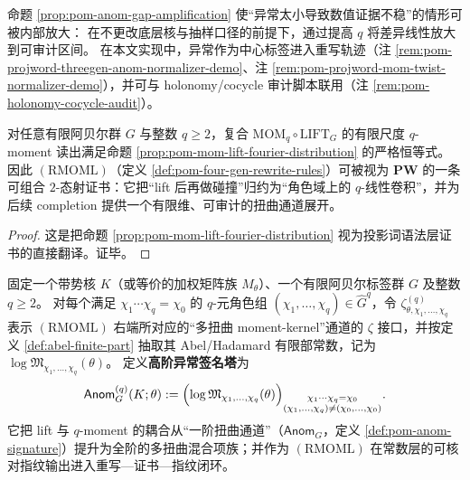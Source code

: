 \begin{remark}\label{rem:pom-anom-gap-amplification-meaning}
命题 \ref{prop:pom-anom-gap-amplification} 使“异常太小导致数值证据不稳”的情形可被内部放大：
在不更改底层核与抽样口径的前提下，通过提高 \(q\) 将差异线性放大到可审计区间。
在本文实现中，异常作为中心标签进入重写轨迹（注 \ref{rem:pom-projword-threegen-anom-normalizer-demo}、注 \ref{rem:pom-projword-mom-twist-normalizer-demo}），并可与 holonomy/cocycle 审计脚本联用（注 \ref{rem:pom-holonomy-cocycle-audit}）。
\end{remark}

\begin{proposition}\label{prop:pom-rmoml-sound}
对任意有限阿贝尔群 \(G\) 与整数 \(q\ge 2\)，复合 \(\mathrm{MOM}_q\circ \mathrm{LIFT}_G\) 的有限尺度 \(q\)-moment 读出满足命题 \ref{prop:pom-mom-lift-fourier-distribution} 的严格恒等式。
因此 \((\mathrm{RMOML})\)（定义 \ref{def:pom-four-gen-rewrite-rules}）可被视为 \(\mathbf{PW}\) 的一条可组合 \(2\)-态射证书：它把“lift 后再做碰撞”归约为“角色域上的 \(q\)-线性卷积”，并为后续 completion 提供一个有限维、可审计的扭曲通道展开。
\end{proposition}
\begin{proof}
这是把命题 \ref{prop:pom-mom-lift-fourier-distribution} 视为投影词语法层证书的直接翻译。证毕。
\end{proof}

\begin{definition}\label{def:pom-anom-signature-tower}
固定一个带势核 \(K\)（或等价的加权矩阵族 \(M_\theta\)）、一个有限阿贝尔标签群 \(G\) 及整数 \(q\ge 2\)。
对每个满足 \(\chi_1\cdots\chi_q=\chi_0\) 的 \(q\)-元角色组 \((\chi_1,\dots,\chi_q)\in\widehat G^q\)，令
\(\zeta^{(q)}_{\theta,\chi_1,\dots,\chi_q}\)
表示 \((\mathrm{RMOML})\) 右端所对应的“多扭曲 moment-kernel”通道的 \(\zeta\) 接口，并按定义 \ref{def:abel-finite-part} 抽取其 Abel/Hadamard 有限部常数，记为 \(\log\mathfrak{M}_{\chi_1,\dots,\chi_q}(\theta)\)。
定义\textbf{高阶异常签名塔}为
\[
\mathsf{Anom}^{(q)}_{G}(K;\theta)
:=\Bigl(\log\mathfrak{M}_{\chi_1,\dots,\chi_q}(\theta)\Bigr)_{\substack{\chi_1\cdots\chi_q=\chi_0\\ (\chi_1,\dots,\chi_q)\neq(\chi_0,\dots,\chi_0)}}.
\]
它把 lift 与 \(q\)-moment 的耦合从“一阶扭曲通道”（\(\mathsf{Anom}_G\)，定义 \ref{def:pom-anom-signature}）提升为全阶的多扭曲混合项族；并作为 \((\mathrm{RMOML})\) 在常数层的可核对指纹输出进入重写—证书—指纹闭环。
\end{definition}

